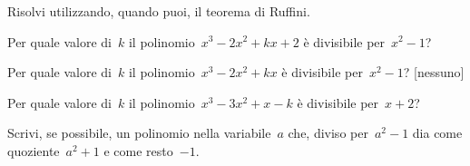 % 

\subsubsection*{}

\begin{esercizio}[*]
\label{ese:div.006}
Risolvi utilizzando, quando puoi, il teorema di Ruffini.
\begin{enumeratea}
\item Per quale valore di~\(k\) il polinomio~\(x^{3}-2x^{2}+kx+2\) 
è divisibile per~\(x^{2}-1\)? 
\item Per quale valore di~\(k\) il polinomio~\(x^{3}-2x^{2}+kx\) 
è divisibile per~\(x^{2}-1\)? 
\hfill[nessuno]
\item Per quale valore di~\(k\) il polinomio~\(x^{3}-3x^{2}+x-k\) 
è divisibile per~\(x+2\)? 
\item Scrivi, se possibile, un polinomio nella variabile~\(a\) che, 
diviso per~\(a^{2}-1\) dia come quoziente~\(a^{2}+1\) e 
come resto~\(-1\). 
\end{enumeratea}
\end{esercizio}

